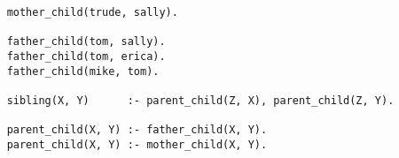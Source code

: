 \documentclass[a4paper]{article}
\begin{document}
    \begin{verbatim}
    mother_child(trude, sally).

    father_child(tom, sally).
    father_child(tom, erica).
    father_child(mike, tom).

    sibling(X, Y)      :- parent_child(Z, X), parent_child(Z, Y).

    parent_child(X, Y) :- father_child(X, Y).
    parent_child(X, Y) :- mother_child(X, Y).
    \end{verbatim}
\end{document}

